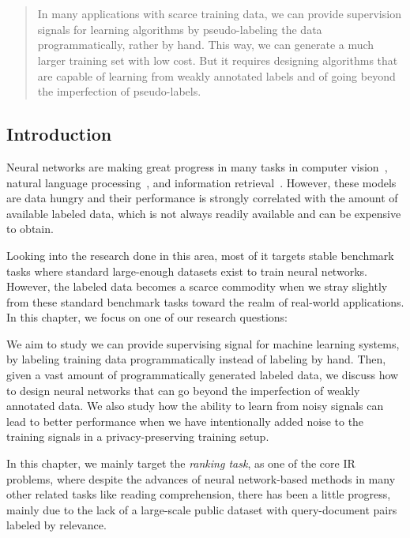 \chapter{}
\label{chap:4}
%
\begin{quote}
In many applications with scarce training data, we can provide supervision signals for learning algorithms by pseudo-labeling the data programmatically, rather by hand. This way, we can generate a much larger training set with low cost. But it requires designing algorithms that are capable of learning from weakly annotated labels and of going beyond the imperfection of pseudo-labels. 
\end{quote}
%
\section{Introduction}
Neural networks are making great progress in many tasks in computer vision~\citep{krizhevsky2012imagenet}, natural language processing~\citep{collobert2008unified}, and information retrieval~\citep{welling2005exponential}. However, these models are data hungry and their performance is strongly correlated with the amount of available labeled data, which is not always readily available and can be expensive to obtain. 

Looking into the research done in this area, most of it targets stable benchmark tasks where standard large-enough datasets exist to train neural networks. However, the labeled data becomes a scarce commodity when we stray slightly from these standard benchmark tasks toward the realm of real-world applications. In this chapter, we focus on one of our research questions:

We aim to study we can provide supervising signal for machine learning systems, by labeling training data programmatically instead of labeling by hand. Then, given a vast amount of programmatically generated labeled data, we discuss how to design neural networks that can go beyond the imperfection of weakly annotated data. We also study how the ability to learn from noisy signals can lead to better performance when we have intentionally added noise to the training signals in a privacy-preserving training setup.

\medskip
In this chapter, we mainly target the \emph{ranking task}, as one of the core IR problems, where despite the advances of neural network-based methods in many other related tasks like reading comprehension, there has been a little progress, mainly due to the lack of a large-scale public dataset with query-document pairs labeled by relevance. 

